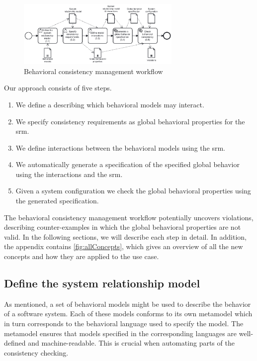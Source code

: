 \documentclass{jot}
\begin{document}
\begin{figure}[h]
    \centering
    \includegraphics[width=0.7\textwidth]{figures/workflow.pdf}
    \caption{Behavioral consistency management workflow}
    \label{fig:approach}
\end{figure}

Our approach consists of five steps.
\begin{enumerate}
    \item We define a  describing which behavioral models may interact.
    \item We specify consistency requirements as global behavioral properties for the \gls*{srm}.
    \item We define interactions between the behavioral models using the \gls*{srm}.
    \item We automatically generate a specification of the specified global behavior using the interactions and the \gls*{srm}.
    \item Given a system configuration we check the global behavioral properties using the generated specification.
\end{enumerate}
The behavioral consistency management workflow potentially uncovers violations, describing counter-examples in which the global behavioral properties are not valid.
In the following sections, we will describe each step in detail.
In addition, the appendix contains \cref{fig:allConcepts}, which gives an overview of all the new concepts and how they are applied to the use case.


\subsection{Define the system relationship model}
As mentioned, a set of behavioral models might be used to describe the behavior of a software system.
Each of these models conforms to its own metamodel which in turn corresponds to the behavioral language used to specify the model.
The metamodel ensures that models specified in the corresponding languages are well-defined and machine-readable.
This is crucial when automating parts of the consistency checking.
\end{document}
